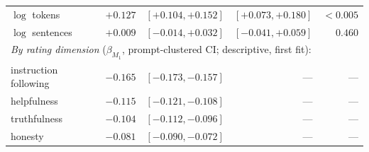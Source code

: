\begin{table}[tb]
\begin{tabular}{lrrrr}
$\log$ tokens & $+0.127$ & $[+0.104,+0.152]$ & $[+0.073,+0.180]$ & $<0.005$ \\
$\log$ sentences & $+0.009$ & $[-0.014,+0.032]$ & $[-0.041,+0.059]$ & $0.460$ \\
\midrule
\multicolumn{5}{l}{\emph{By rating dimension} ($\beta_{M_1}$, prompt-clustered CI; descriptive, first fit):}\\
instruction following & $-0.165$ & $[-0.173,-0.157]$ & --- & --- \\
helpfulness & $-0.115$ & $[-0.121,-0.108]$ & --- & --- \\
truthfulness & $-0.104$ & $[-0.112,-0.096]$ & --- & --- \\
honesty & $-0.081$ & $[-0.090,-0.072]$ & --- & --- \\
\bottomrule
\end{tabular}
\end{table}

